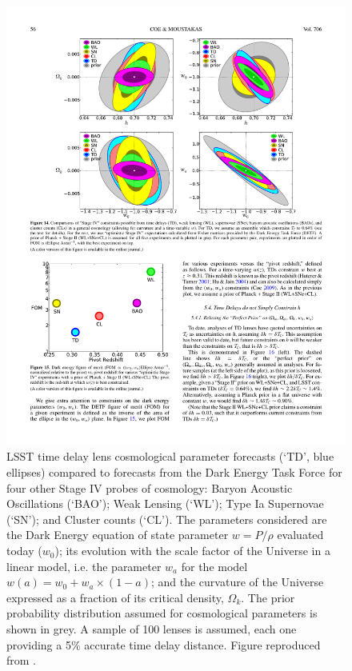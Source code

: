 \begin{figure}[!t]
    \centering\includegraphics[width=0.9\linewidth]{figs/Coe+Moustakas2009_Figure14.pdf}
    \caption{LSST time delay lens cosmological parameter forecasts (`TD', blue ellipses)
    compared to forecasts from the Dark
    Energy Task Force \citep{DETF} for four other Stage IV probes of cosmology: Baryon Acoustic Oscillations (`BAO'); Weak Lensing (`WL'); Type Ia Supernovae (`SN'); and Cluster counts (`CL').  The parameters considered are the Dark Energy equation of state parameter $w=P/\rho$ evaluated today ($w_0$); its evolution with the scale factor of the Universe in a linear model, i.e. the parameter $w_a$ for the model $w(a) = w_0 + w_a\times(1-a)$; and the curvature of the Universe expressed as a fraction of its critical density, $\Omega_k$.   The prior probability distribution assumed for cosmological parameters is shown in grey.
    A sample of 100 lenses is assumed, each one
    providing a 5\% accurate time delay distance. Figure reproduced from
    \citet{Coe+Moustakas2009}.}
    \label{fig:sl_forecast}
\end{figure}


